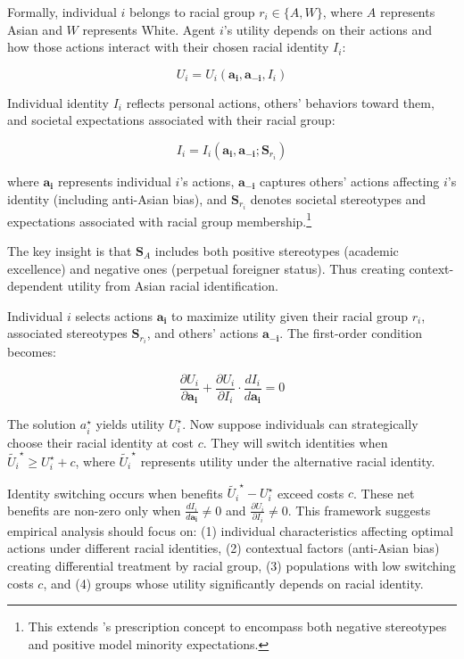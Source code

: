 Formally, individual $i$ belongs to racial group $r_i \in \{A, W\}$, where $A$ represents Asian and $W$ represents White. Agent $i$'s utility depends on their actions and how those actions interact with their chosen racial identity $I_i$:

\begin{equation}
U_i = U_i(\pmb{a_i}, \pmb{a_{-i}}, I_i)\label{eq:util}
\end{equation}

Individual identity $I_i$ reflects personal actions, others' behaviors toward them, and societal expectations associated with their racial group:

\begin{equation}
I_i = I_i(\pmb{a_i}, \pmb{a_{-i}}; \pmb{S}_{r_{i}})\label{eq:identity}
\end{equation}

where $\pmb{a_i}$ represents individual $i$'s actions, $\pmb{a_{-i}}$ captures others' actions affecting $i$'s identity (including anti-Asian bias), and $\pmb{S}_{r_{i}}$ denotes societal stereotypes and expectations associated with racial group membership.\footnote{This extends \textcite{akerlofEconomicsIdentity2000}'s prescription concept to encompass both negative stereotypes and positive model minority expectations.}

The key insight is that $\pmb{S}_{A}$ includes both positive stereotypes (academic excellence) and negative ones (perpetual foreigner status). Thus creating context-dependent utility from Asian racial identification.

Individual $i$ selects actions $\pmb{a_i}$ to maximize utility given their racial group $r_i$, associated stereotypes $\pmb{S}_{r_{i}}$, and others' actions $\pmb{a_{-i}}$. The first-order condition becomes:

\begin{equation}
\frac{\partial U_i}{\partial \pmb{a_i}} + \frac{\partial U_i}{\partial I_i} \cdot \frac{d I_i}{d \pmb{a_i}} = 0\label{eq:foc}
\end{equation}

The solution $a_{i}^{\star}$ yields utility $U_{i}^{\star}$. Now suppose individuals can strategically choose their racial identity at cost $c$. They will switch identities when $\tilde{U_{i}}^{\star} \geq U_{i}^{\star} + c$, where $\tilde{U_{i}}^{\star}$ represents utility under the alternative racial identity.

Identity switching occurs when benefits $\tilde{U_{i}}^{\star} - U_{i}^{\star}$ exceed costs $c$. These net benefits are non-zero only when $\frac{d I_i}{d \pmb{a_i}} \neq 0$ and $\frac{\partial U_i}{\partial I_i} \neq 0$. This framework suggests empirical analysis should focus on: (1) individual characteristics affecting optimal actions under different racial identities, (2) contextual factors (anti-Asian bias) creating differential treatment by racial group, (3) populations with low switching costs $c$, and (4) groups whose utility significantly depends on racial identity.

